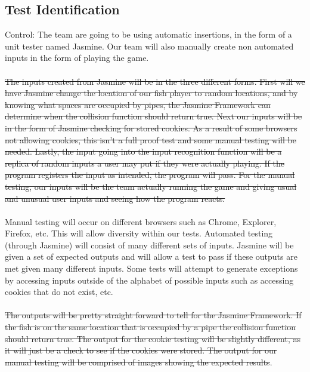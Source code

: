 \documentclass[11pt, oneside]{article}   	%
\begin{document}
\subsection{Test Identification}
Control: The team are going to be using automatic insertions, in the form of a unit tester named Jasmine. Our team will also manually create non automated inputs in the form of playing the game.\\
\\
\sout{The inputs created from Jasmine will be in the three different forms. First will we have Jasmine change the location of our fish player to random locations, and by knowing what spaces are occupied by pipes, the Jasmine Framework can determine when the collision function should return true. Next our inputs will be in the form of Jasmine checking for stored cookies. As a result of some browsers not allowing cookies, this isn't a full proof test and some manual testing will be needed. Lastly, the input going into the input recognition function will be a replica of random inputs a user may put if they were actually playing. If the program registers the input as intended, the program will pass. For the manual testing, our inputs will be the team actually running the game and giving usual and unusual user inputs and seeing how the program reacts.}\\
 \\
Manual testing will occur on different browsers such as Chrome, Explorer, Firefox, etc. This will allow diversity within our tests. Automated testing (through Jasmine) will consist of many different sets of inputs. Jasmine will be given a set of expected outputs and will allow a test to pass if these outputs are met given many different inputs. Some tests will attempt to generate exceptions by accessing inputs outside of the alphabet of possible inputs such as accessing cookies that do not exist, etc.\\
\\
\sout{The outputs will be pretty straight forward to tell for the Jasmine Framework. If the fish is on the same location that is occupied by a pipe the collision function should return true. The output for the cookie testing will be slightly different, as it will just be a check to see if the cookies were stored. The output for our manual testing will be comprised of images showing the expected results}.
\end{document}
